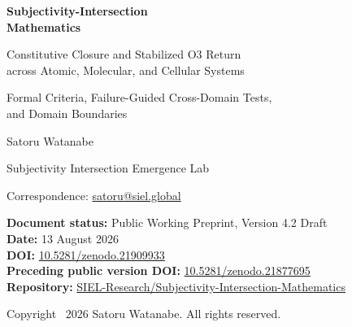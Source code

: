\documentclass[11pt,a4paper]{article}
\begin{document}
\begin{titlepage}
\thispagestyle{empty}
\vspace*{18mm}
{\sffamily\bfseries\color{SIELblue}\fontsize{24}{29}\selectfont
\mbox{Subjectivity-Intersection}\\Mathematics\par}
\vspace{6mm}
{\sffamily\fontsize{18}{23}\selectfont
Constitutive Closure and Stabilized O3 Return\\across Atomic, Molecular, and Cellular Systems\par}
\vspace{7mm}
{\sffamily\fontsize{15}{19}\selectfont
Formal Criteria, Failure-Guided Cross-Domain Tests,\\and Domain Boundaries\par}

\vspace{18mm}
{\large Satoru Watanabe\par}
\vspace{2mm}
{\normalsize Subjectivity Intersection Emergence Lab\par}
{\normalsize Correspondence: \href{mailto:satoru@siel.global}{satoru@siel.global}\par}

\vfill
\noindent\colorbox{SIELlight}{%
  \parbox{0.93\textwidth}{%
  \vspace{2mm}
  \textbf{Document status:} Public Working Preprint, Version 4.2 Draft\\
  \textbf{Date:} 13 August 2026\\
  \textbf{DOI:} \href{https://doi.org/10.5281/zenodo.21909933}{10.5281/zenodo.21909933}\\
  \textbf{Preceding public version DOI:} \href{https://doi.org/10.5281/zenodo.21877695}{10.5281/zenodo.21877695}\\
  \textbf{Repository:} \href{https://github.com/SIEL-Research/Subjectivity-Intersection-Mathematics}{SIEL-Research/Subjectivity-Intersection-Mathematics}\\
  \vspace{2mm}
  }}

\vspace{10mm}
{\small Copyright \textcopyright\ 2026 Satoru Watanabe. All rights reserved.\par}
\end{titlepage}
\end{document}
